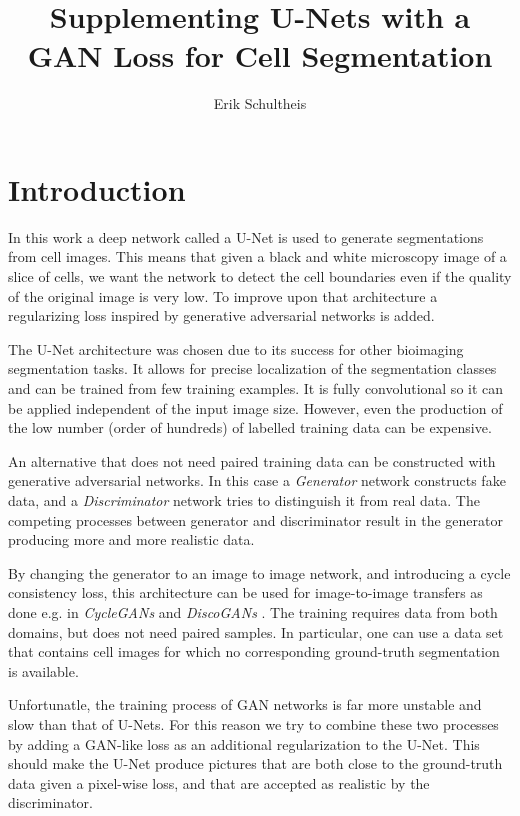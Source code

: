 \documentclass[aps,prl,twocolumn,groupedaddress,amsmath,amssymb]{revtex4-1}
\begin{document}
    \title{Supplementing U-Nets with a GAN Loss for Cell Segmentation}
    \author{Erik Schultheis}
    \maketitle

	\section{Introduction}

    In this work a deep network called a U-Net \cite{ronneberger2015u} is used to generate
    segmentations from cell images. This means that given a black and white microscopy image of a
    slice of cells, we want the  network to detect the cell boundaries even if the quality of the
    original image is very low. To improve upon that architecture a regularizing loss inspired by
    generative adversarial  networks is added.

    The U-Net architecture was chosen due to its success for other bioimaging segmentation tasks. 
    It allows for precise localization of the segmentation classes and can be trained from few
    training examples. It is fully convolutional so it can be applied independent of the input
    image size. However, even the production of the low number (order of hundreds) of labelled
    training data can be expensive. 

    An alternative that does not need paired training data can be constructed with generative
    adversarial networks. In this case a \emph{Generator} network constructs fake data, and a
    \emph{Discriminator} network tries to distinguish it from real data. The competing  processes
    between generator and discriminator result in the generator producing more and more realistic
    data.

    By changing the generator to an image to image network, and introducing a cycle consistency
    loss, this architecture can be used for image-to-image transfers as done e.g. in
    \emph{CycleGANs} \cite{zhu2017unpaired} and \emph{DiscoGANs} \cite{kim2017learning}.  The
    training requires data from both domains, but does not need paired samples. In particular, one
    can use a data set that contains cell images for which no corresponding ground-truth
    segmentation is available.
    
    Unfortunatle, the training process of GAN networks is far more unstable and slow than that of 
    U-Nets. For this reason we try to combine these two processes by adding a GAN-like loss as an
    additional regularization to the U-Net. This should make the U-Net produce pictures that are 
    both close to the ground-truth data given a pixel-wise loss, and that are accepted as realistic
    by the discriminator.
\end{document}
